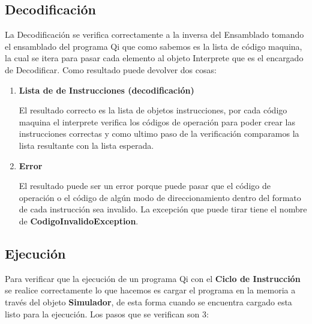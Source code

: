 \subsection{Decodificación}
La Decodificación se verifica correctamente a la inversa del Ensamblado tomando el ensamblado del programa Qi que como sabemos es la lista de código maquina, la cual se itera para pasar cada elemento al objeto Interprete que es el encargado de Decodificar. Como resultado puede devolver dos cosas: 
\begin{enumerate}
\item \textbf{Lista de de Instrucciones (decodificación)} 

El resultado correcto es la lista de objetos instrucciones, por cada código maquina el interprete verifica los códigos de operación para poder crear las instrucciones correctas y como ultimo paso de la verificación comparamos la lista resultante con la lista esperada.
\item\textbf{Error}

El resultado puede ser un error porque puede pasar que el código de operación o el código de algún modo de direccionamiento dentro del formato de cada instrucción sea invalido. La excepción que puede tirar tiene el nombre de \textbf{CodigoInvalidoException}.   
\end{enumerate}

\subsection{Ejecución}

Para verificar que la ejecución de un programa Qi con el \textbf{Ciclo de Instrucción} se realice correctamente lo que hacemos es cargar el programa en la memoria a través del objeto \textbf{Simulador}, de esta forma cuando se encuentra cargado esta listo para la ejecución. Los pasos que se verifican son 3:

